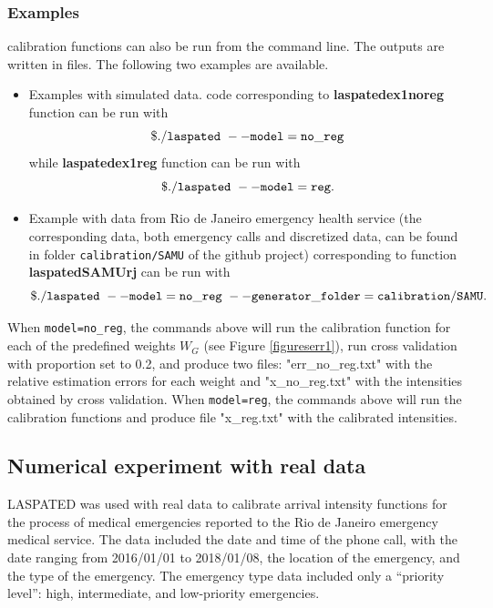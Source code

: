\documentclass[article]{jss}
\begin{document}
{\begin{lstlisting}[label={list:13},caption=Cross validation in \proglang{C++}]
\end{lstlisting}



\subsubsection{Examples}

  calibration functions can also be run from the command line. The outputs are written in files. The following two examples are available.

\begin{itemize}
    \item Examples with simulated data.  code corresponding to 
     \textbf{laspatedex1noreg} function can be run with
    $$
    {\tt{\$./laspated\text{ }--model=no\_reg}}
    $$
    while 
     \textbf{laspatedex1reg} function can be run with
    $$
    {\tt{\$./laspated\text{ }--model=reg.}}
    $$
    \item Example with data from Rio de Janeiro emergency health service (the corresponding
    data, both emergency calls and discretized
    data, can be found in folder {\tt{calibration/SAMU}} of the github project)
    corresponding to  function 
    {\textbf{laspatedSAMUrj}} can be run
    with
    $$
    {\tt{\$./laspated\text{ }--model=no\_reg\text{ }--generator\_folder=calibration/SAMU}}.
    $$
\end{itemize}

When {\tt{model=no\_reg}}, the commands above will run the calibration function for each of the predefined weights  \(W_G\) (see Figure \ref{figureserr1}), run cross validation with proportion set to 0.2, and produce two files: "err\_no\_reg.txt" with the relative estimation errors for each weight and "x\_no\_reg.txt" with the intensities obtained by cross validation. When {\tt{model=reg}}, the commands above will run the calibration functions and produce  file "x\_reg.txt" with the calibrated intensities.
}


\subsection{Numerical experiment with real data}
\label{sec:case-study}

LASPATED was used with real data to calibrate arrival intensity functions for the process of medical emergencies reported to the Rio de Janeiro emergency medical service.
The data included the date and time of the phone call, with the date ranging from 2016/01/01 to 2018/01/08, the location of the emergency, and the type of the emergency.
The emergency type data included only a ``priority level'': high, intermediate, and low-priority emergencies.
\end{document}
